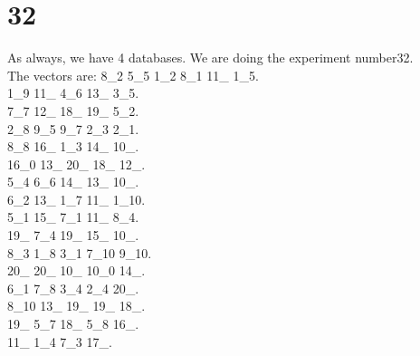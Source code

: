 \chapter{32}
\indent As always, we have 4 databases. We are doing the experiment number32.\\
The vectors are:
8\_2 5\_5 1\_2 8\_1 11\_ 1\_5.\\1\_9 11\_ 4\_6 13\_ 3\_5.\\7\_7 12\_ 18\_ 19\_ 5\_2.\\2\_8 9\_5 9\_7 2\_3 2\_1.\\8\_8 16\_ 1\_3 14\_ 10\_.\\16\_0 13\_ 20\_ 18\_ 12\_.\\5\_4 6\_6 14\_ 13\_ 10\_.\\6\_2 13\_ 1\_7 11\_ 1\_10.\\5\_1 15\_ 7\_1 11\_ 8\_4.\\19\_ 7\_4 19\_ 15\_ 10\_.\\8\_3 1\_8 3\_1 7\_10 9\_10.\\20\_ 20\_ 10\_ 10\_0 14\_.\\6\_1 7\_8 3\_4 2\_4 20\_.\\8\_10 13\_ 19\_ 19\_ 18\_.\\19\_ 5\_7 18\_ 5\_8 16\_.\\11\_ 1\_4 7\_3 17\_.\\